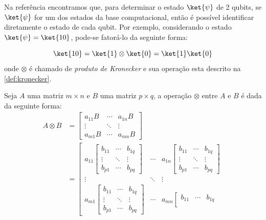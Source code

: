 Na referência \textcite{Marquezino2019} encontramos que, para determinar o estado $\ket{\psi}$ de 2 qubits, se $\ket{\psi}$ for um dos estados da base computacional, então é possível identificar diretamente o estado de cada qubit. Por exemplo, considerando o estado $\ket{\psi}=\ket{10}$, pode-se fatorá-lo da seguinte forma:

$$
    \ket{10}=\ket{1}\otimes\ket{0}=\ket{1}\ket{0}
$$
onde $\otimes$ é chamado de \textit{produto de Kronecker} e sua operação esta descrito na \autoref{def:kronecker}.
\begin{defi}\label{def:kronecker}
    Seja $A$ uma matriz $m\times n$ e $B$ uma matriz $p\times q$, a operação $\otimes$ entre $A$ e $B$ é dada da seguinte forma:
    \begin{align*}
        A\otimes B & =\left[\begin{array}{ccc}
            a_{11}B & \cdots & a_{1n}B \\
            \vdots & \ddots & \vdots \\
            a_{m1}B & \cdots & a_{mn}B
        \end{array}\right] \\&
        = \left[\begin{array}{ccc}
            a_{11}\left[\begin{array}{ccc}
            b_{11} & \cdots & b_{1q} \\
            \vdots & \ddots & \vdots \\
            b_{p1} & \cdots & b_{pq}
        \end{array}\right]   & \cdots & a_{1n}\left[\begin{array}{ccc}
            b_{11} & \cdots & b_{1q} \\
            \vdots & \ddots & \vdots \\
            b_{p1} & \cdots & b_{pq}
        \end{array}\right]  \\
            \vdots & \ddots & \vdots \\
            a_{m1}\left[\begin{array}{ccc}
            b_{11} & \cdots & b_{1q} \\
            \vdots & \ddots & \vdots \\
            b_{p1} & \cdots & b_{pq}
        \end{array}\right]  & \cdots & a_{mn}\left[\begin{array}{ccc}
            b_{11} & \cdots & b_{1q} \\

\end{array}
\end{array}
\end{align*}
\end{defi}
